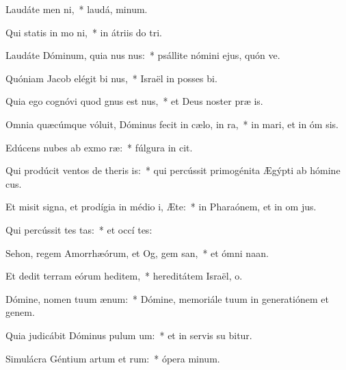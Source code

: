 \item Laudáte men ni,~* laudá,  minum.
\item Qui statis in mo ni,~* in átriis do  tri.
\item Laudáte Dóminum, quia nus nus:~* psállite nómini ejus, quón ve.
\item Quóniam Jacob elégit bi nus,~* Israël in posses bi.
\item Quia ego cognóvi quod gnus est nus,~* et Deus noster præ  is.
\item Omnia quæcúmque vóluit, Dóminus fecit in cælo,  in ra,~* in mari, et in óm sis.
\item Edúcens nubes ab exmo ræ:~* fúlgura in  cit.
\item Qui prodúcit ventos de theris is:~* qui percússit primogénita Ægýpti ab hómine   cus.
\item Et misit signa, et prodígia in médio i, Æte:~* in Pharaónem, et in om  jus.
\item Qui percússit tes tas:~* et occí  tes:
\item Sehon, regem Amorrhæórum, et Og, gem san,~* et ómni  naan.
\item Et dedit terram eórum heditem,~* hereditátem Israël,  o.
\item Dómine, nomen tuum  ænum:~* Dómine, memoriále tuum in generatiónem et genem.
\item Quia judicábit Dóminus pulum um:~* et in servis su bitur.
\item Simulácra Géntium artum et rum:~* ópera  minum.
